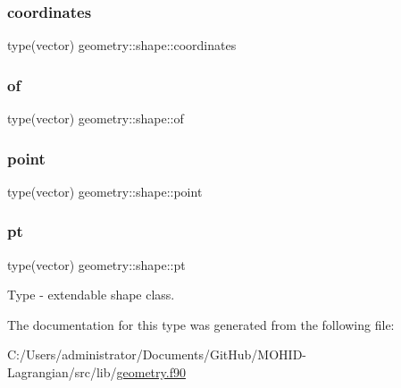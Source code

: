 \subsubsection{\texorpdfstring{coordinates}{coordinates}}
{\footnotesize\ttfamily type(vector) geometry\+::shape\+::coordinates}

\mbox{\label{structgeometry_1_1shape_a00023e2069f5764880267801959ecb30}} 
\subsubsection{\texorpdfstring{of}{of}}
{\footnotesize\ttfamily type(vector) geometry\+::shape\+::of}

\mbox{\label{structgeometry_1_1shape_a56d125828996ab14b6eb030cac6d242f}} 
\subsubsection{\texorpdfstring{point}{point}}
{\footnotesize\ttfamily type(vector) geometry\+::shape\+::point}

\mbox{\label{structgeometry_1_1shape_aada595aa3503cf22350737caf2931e6a}} 
\subsubsection{\texorpdfstring{pt}{pt}}
{\footnotesize\ttfamily type(vector) geometry\+::shape\+::pt}



Type -\/ extendable shape class. 



The documentation for this type was generated from the following file\+:\begin{DoxyCompactItemize}
\item 
C\+:/\+Users/administrator/\+Documents/\+Git\+Hub/\+M\+O\+H\+I\+D-\/\+Lagrangian/src/lib/\mbox{\hyperlink{geometry_8f90}{geometry.\+f90}}\end{DoxyCompactItemize}
